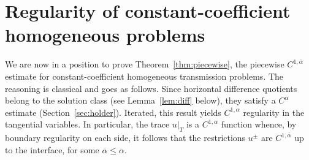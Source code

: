 \documentclass[letter,11pt]{amsart}
\theoremstyle{definition}
\numberwithin{equation}{section}
\begin{document}

\section{Regularity of constant-coefficient homogeneous problems}
\label{sec:piecewise}

We are now in a position to prove Theorem~\ref{thm:piecewise}, the piecewise $C^{1,\overline{\alpha}}$ estimate for constant-coefficient homogeneous transmission problems.
The reasoning is classical and goes as follows.
Since horizontal difference quotients belong to the solution class (see Lemma~\ref{lem:diff} below), 
they satisfy a $C^{\alpha}$ estimate (Section~\ref{sec:holder}).
Iterated, this result yields $C^{1,\alpha}$ regularity in the tangential variables.
In particular, the trace $u|_{T}$ is a $C^{1,\alpha}$ function whence, by boundary regularity on each side, it follows that the restrictions $u^{\pm}$ are $C^{1,\overline{\alpha}}$ up to the interface, for some $\overline{\alpha} \leq \alpha$.

\medskip
\end{document}
